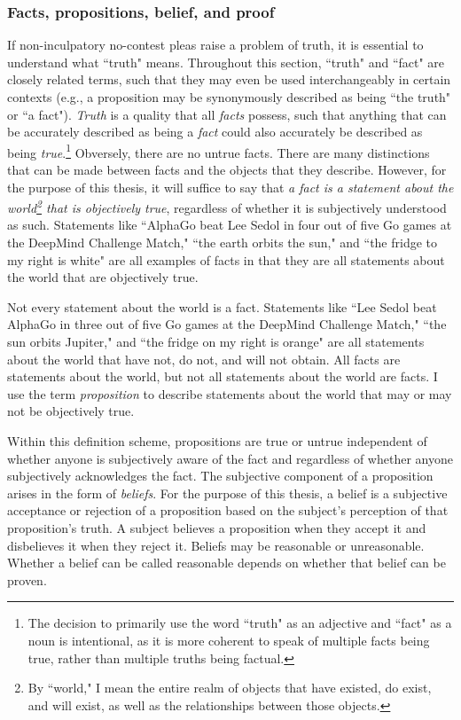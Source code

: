 \subsubsection{Facts, propositions, belief, and proof}

If non-inculpatory no-contest pleas raise a problem of truth, it is essential to understand what ``truth" means. Throughout this section, ``truth" and ``fact" are closely related terms, such that they may even be used interchangeably in certain contexts (e.g., a proposition may be synonymously described as being ``the truth" or ``a fact"). \textit{Truth} is a quality that all \textit{facts} possess, such that anything that can be accurately described as being a \textit{fact} could also accurately be described as being \textit{true}.\footnote{The decision to primarily use the word ``truth" as an adjective and ``fact" as a noun is intentional, as it is more coherent to speak of multiple facts being true, rather than multiple truths being factual.} Obversely, there are no untrue facts. There are many distinctions that can be made between facts and the objects that they describe. However, for the purpose of this thesis, it will suffice to say that \textit{a fact is a statement about the world\footnote{By ``world," I mean the entire realm of objects that have existed, do exist, and will exist, as well as the relationships between those objects.} that is objectively true}, regardless of whether it is subjectively understood as such. Statements like ``AlphaGo beat Lee Sedol in four out of five Go games at the DeepMind Challenge Match," ``the earth orbits the sun," and ``the fridge to my right is white" are all examples of facts in that they are all statements about the world that are objectively true.

Not every statement about the world is a fact. Statements like ``Lee Sedol beat AlphaGo in three out of five Go games at the DeepMind Challenge Match," ``the sun orbits Jupiter," and ``the fridge on my right is orange" are all statements about the world that have not, do not, and will not obtain. All facts are statements about the world, but not all statements about the world are facts. I use the term \textit{proposition} to describe statements about the world that may or may not be objectively true.

Within this definition scheme, propositions are true or untrue independent of whether anyone is subjectively aware of the fact and regardless of whether anyone subjectively acknowledges the fact. The subjective component of a proposition arises in the form of \textit{beliefs}. For the purpose of this thesis, a belief is a subjective acceptance or rejection of a proposition based on the subject's perception of that proposition's truth. A subject believes a proposition when they accept it and disbelieves it when they reject it. Beliefs may be reasonable or unreasonable. Whether a belief can be called reasonable depends on whether that belief can be proven.

